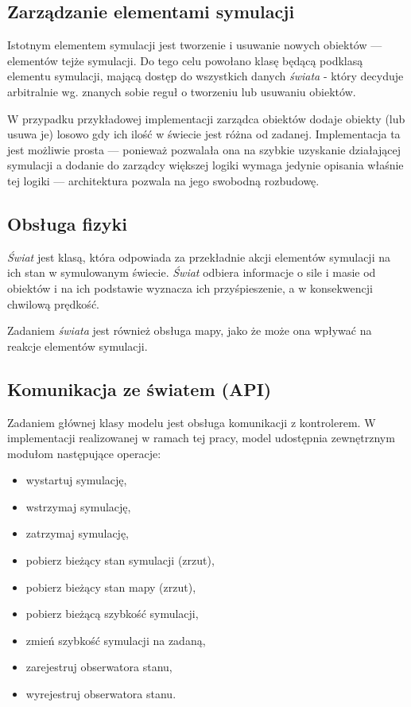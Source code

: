 {{{\subsection{Zarządzanie elementami symulacji}
\par{
Istotnym elementem symulacji jest tworzenie i usuwanie nowych obiektów --- elementów tejże symulacji. Do tego celu powołano klasę będącą podklasą elementu symulacji, mającą dostęp do wszystkich danych \textit{świata} - który decyduje arbitralnie  wg. znanych sobie reguł o tworzeniu lub usuwaniu obiektów.
}
\par{
W przypadku przykładowej implementacji zarządca obiektów dodaje obiekty (lub usuwa je) losowo gdy ich ilość w świecie jest różna od zadanej. Implementacja ta jest możliwie prosta --- ponieważ pozwalała ona na szybkie uzyskanie działającej symulacji a dodanie do zarządcy większej logiki wymaga jedynie opisania właśnie tej logiki --- architektura pozwala na jego swobodną rozbudowę.
}

\subsection{Obsługa fizyki}
\par{
\textit{Świat} jest klasą, która odpowiada za przekładnie akcji elementów symulacji na ich stan w symulowanym świecie. \textit{Świat} odbiera informacje o sile i masie od obiektów i na ich podstawie wyznacza ich przyśpieszenie, a w konsekwencji chwilową prędkość.
}
\par{
Zadaniem \textit{świata} jest również obsługa mapy, jako że może ona wpływać na reakcje elementów symulacji.
}

\subsection{Komunikacja ze światem (API)}
\par{
Zadaniem głównej klasy modelu jest obsługa komunikacji z kontrolerem. W implementacji realizowanej w ramach tej pracy, model udostępnia zewnętrznym modułom następujące operacje:
\begin{itemize}
\item wystartuj symulację,
\item wstrzymaj symulację,
\item zatrzymaj symulację,
\item pobierz bieżący stan symulacji (zrzut),
\item pobierz bieżący stan mapy (zrzut),
\item pobierz bieżącą szybkość symulacji,
\item zmień szybkość symulacji na zadaną,
\item zarejestruj obserwatora stanu,
\item wyrejestruj obserwatora stanu.
\end{itemize}
}
}}}
